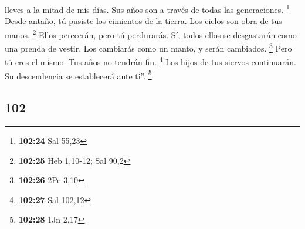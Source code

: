 \begin{paracol}{2}
lleves a la mitad de mis días. Sus años son a través de todas las
generaciones. \footnote{\textbf{102:24} Sal 55,23}  Desde
antaño, tú pusiste los cimientos de la tierra. Los cielos son obra de
tus manos. \footnote{\textbf{102:25} Heb 1,10-12; Sal 90,2}
 Ellos perecerán, pero tú perdurarás. Sí, todos ellos se
desgastarán como una prenda de vestir. Los cambiarás como un manto, y
serán cambiados. \footnote{\textbf{102:26} 2Pe 3,10} 
Pero tú eres el mismo. Tus años no tendrán fin. \footnote{\textbf{102:27}
  Sal 102,12}  Los hijos de tus siervos continuarán. Su
descendencia se establecerá ante ti''. \footnote{\textbf{102:28} 1Jn
  2,17}

\switchcolumn
\begin{otherlanguage}{english}

\hypertarget{section-203}{%
\section{102}\label{section-203}}


\end{otherlanguage}
\end{paracol}
